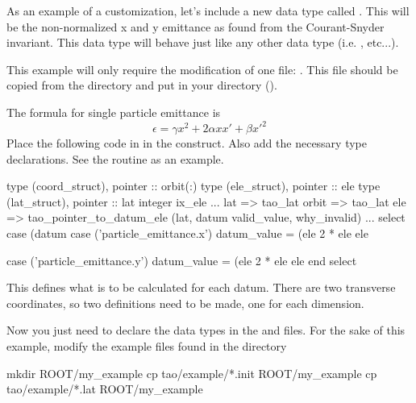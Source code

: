 {{{{As an example of a customization, let's include a new data type called . This
will be the non-normalized x and y emittance as found from the Courant-Snyder invariant. This data
type will behave just like any other data type (i.e.  ,  etc...).

This example will only require the modification of one file:
. This file should be copied from the  directory and
put in your  directory ().

The formula for single particle emittance is
\begin{equation}
  \epsilon = \gamma x^{2} + 2 \alpha x x' + \beta x'^{2}
  \label{e:emittance}
\end{equation}
Place the following code in  in the 
construct. Also add the necessary type declarations. See the routine  as an
example.
\begin{example}
  type (coord_struct), pointer :: orbit(:)
  type (ele_struct), pointer :: ele
  type (lat_struct), pointer :: lat
  integer ix_ele
  ...
  lat => tao_lat%
  orbit => tao_lat%
  ele => tao_pointer_to_datum_ele (lat, datum%
                                                          valid_value, why_invalid)
  ...
  select case (datum%
  case ('particle_emittance.x') 
    datum_value =  (ele%
		     2 * ele%
		     ele%
    
  case ('particle_emittance.y')
    datum_value = (ele%
		     2 * ele%
		     ele%
  end select
\end{example}
This defines what is to be calculated for each  datum.  There are two
transverse coordinates, so two definitions need to be made, one for each dimension.

Now you just need to declare the data types in the  and  files. For
the sake of this example, modify the example files found in the  directory
\begin{example}
	mkdir ROOT/my_example
  cp tao/example/*.init ROOT/my_example
  cp tao/example/*.lat ROOT/my_example
\end{example}

}}}}
